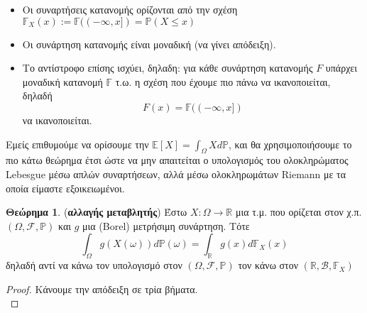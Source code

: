 \documentclass[12pt,a4paper]{article}
\theoremstyle{definition}
\numberwithin{equation}{section}
\newtheorem{theorima}{Θεώρημα}
\begin{document}
{\begin{itemize}
\item Οι συναρτήσεις κατανομής ορίζονται από την σχέση \(\mathbb{F}_X(x) := \mathbb{F}((-\infty,x]) = \mathbb{P}(X\leq x)\)
\item Οι συνάρτηση κατανομής είναι μοναδική (να γίνει απόδειξη).
\item Το αντίστροφο επίσης ισχύει, δηλαδη: για κάθε συνάρτηση κατανομής \(F\) υπάρχει μοναδική κατανομή \(\mathbb{F}\) τ.ω. η σχέση που έχουμε πιο πάνω να ικανοποιείται, δηλαδή
$$F(x) = \mathbb{F}((-\infty,x])$$
να ικανοποιείται.
\end{itemize}


Εμείς επιθυμούμε να ορίσουμε την \(\mathbb{E}[X] = \int_\Omega X d\mathbb{P}\), και θα χρησιμοποιήσουμε το πιο κάτω θεώρημα έτσι ώστε να μην απαιτείται
ο υπολογισμός του ολοκληρώματος Lebesgue μέσω απλών συναρτήσεων, αλλά μέσω ολοκληρωμάτων Riemann με τα οποία είμαστε εξοικειωμένοι.

  \begin{theorima}(\textbf{αλλαγής μεταβλητής}) Έστω $X:\Omega \rightarrow \mathbb{R}$ μια τ.μ. που ορίζεται στον χ.π. $(\Omega,\mathcal{F},\mathbb{P})$ και $g$ μια (Borel) μετρήσιμη συνάρτηση.
    Τότε
$$ \int_\Omega g(X(\omega)) d\mathbb{P}(\omega) = \int_\mathbb{R} g(x)d\mathbb{F}_X(x)$$
δηλαδή αντί να κάνω τον υπολογισμό στον $(\Omega, \mathcal{F}, \mathbb{P})$ τον κάνω στον $(\mathbb{R},\mathcal{B},\mathbb{F}_X)$
  \end{theorima}

\begin{proof} Κάνουμε την απόδειξη σε τρία βήματα.\\


\end{proof}}
\end{document}
